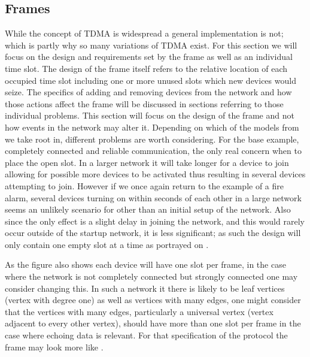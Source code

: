 \subsection{Frames}
While the concept of TDMA is widespread a general implementation is not; which is partly why so many variations of TDMA exist.
For this section we will focus on the design and requirements set by the frame as well as an individual time slot.
The design of the frame itself refers to the relative location of each occupied time slot including one or more unused slots which new devices would seize.
The specifics of adding and removing devices from the network and how those actions affect the frame will be discussed in sections referring to those individual problems.
This section will focus on the design of the frame and not how events in the network may alter it.
Depending on which of the models from  we take root in, different problems are worth considering.
For the base example, completely connected and reliable communication, the only real concern when to place the open slot.
In a larger network it will take longer for a device to join allowing for possible more devices to be activated thus resulting in several devices attempting to join.
However if we once again return to the example of a fire alarm, several devices turning on within seconds of each other in a large network seems an unlikely scenario for other than an initial setup of the network.
Also since the only effect is a slight delay in joining the network, and this would rarely occur outside of the startup network, it is less significant; as such the design will only contain one empty slot at a time as portrayed on .

\bigskip \noindent
As the figure also shows each device will have one slot per frame, in the case where the network is not completely connected but strongly connected one may consider changing this.
In such a network it there is likely to be leaf vertices (vertex with degree one) as well as vertices with many edges, one might consider that the vertices with many edges, particularly a universal vertex (vertex adjacent to every other vertex), should have more than one slot per frame in the case where echoing data is relevant.
For that specification of the protocol the frame may look more like .

